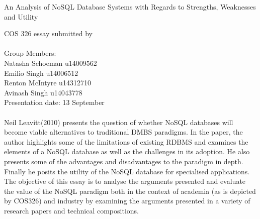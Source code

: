 \documentclass[12pt]{article}
\begin{document}
\begin{titlepage}

\begin{center}
\begin{Huge}
An Analysis of NoSQL Database Systems with Regards to Strengths, Weaknesses and Utility
\begin{large}
\begin{center}
COS 326 essay submitted by
\\
\\
Group Members:\\
Natasha Schoeman u14009562
\\
Emilio Singh u14006512
\\
Renton McIntyre u14312710
\\
Avinash Singh u14043778
\\
Presentation date: 13 September

\end{center}
\end{large}
\end{Huge}

\end{center}
\end{titlepage}
\pagebreak

\paragraph{}
Neil Leavitt(2010) presents the question of whether NoSQL databases will become viable alternatives to traditional DMBS paradigms. In the paper, the author highlights some of the limitations of existing RDBMS and examines the elements of a NoSQL database as well as the challenges in its adoption. He also presents some of the advantages and disadvantages to the paradigm in depth. Finally he posits the utility of the NoSQL database for specialised applications. The objective of this essay is to analyse the arguments presented and evaluate the value of the NoSQL paradigm both in the context of academia (as is depicted by COS326) and industry by examining the arguments presented in a variety of research papers and technical compositions.
\end{document}
